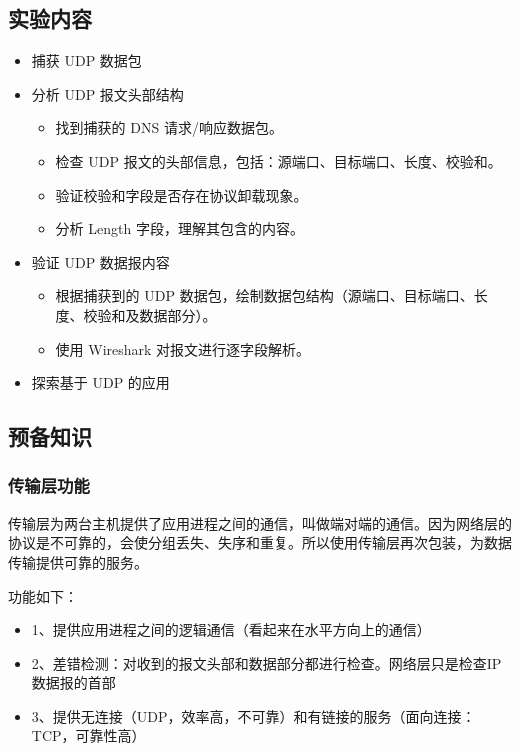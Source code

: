 \documentclass[14pt,a4paper,UTF8,twoside]{article}
\begin{document}
\subsection{实验内容}
\begin{itemize}
 \item 捕获 UDP 数据包
 \item 分析 UDP 报文头部结构
    \begin{itemize}
        \item 找到捕获的 DNS 请求/响应数据包。
        \item 检查 UDP 报文的头部信息，包括：源端口、目标端口、长度、校验和。
        \item 验证校验和字段是否存在协议卸载现象。
        \item 分析 Length 字段，理解其包含的内容。
    \end{itemize}
 \item 验证 UDP 数据报内容
 \begin{itemize}
    \item 根据捕获到的 UDP 数据包，绘制数据包结构（源端口、目标端口、长度、校验和及数据部分）。
    \item 使用 Wireshark 对报文进行逐字段解析。
\end{itemize}
 \item 探索基于 UDP 的应用
\end{itemize}

\subsection{预备知识}

\subsubsection{传输层功能}

传输层为两台主机提供了应用进程之间的通信，叫做端对端的通信。因为网络层的协议是不可靠的，会使分组丢失、失序和重复。所以使用传输层再次包装，为数据传输提供可靠的服务。

功能如下：

\begin{itemize}
   \item 1、提供应用进程之间的逻辑通信（看起来在水平方向上的通信）
   \item 2、差错检测：对收到的报文头部和数据部分都进行检查。网络层只是检查IP数据报的首部
   \item 3、提供无连接（UDP，效率高，不可靠）和有链接的服务（面向连接：TCP，可靠性高）
\end{itemize}
\end{document}
